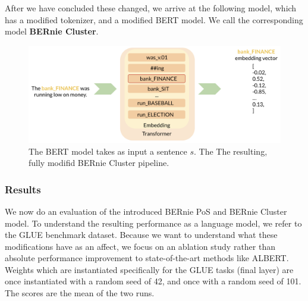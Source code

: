 \documentclass[a4paper,12pt,twoside,openright]{report}
\begin{document}
After we have concluded these changed, we arrive at the following model, which has a modified tokenizer, and a modified BERT model.
We call the corresponding model \textbf{BERnie Cluster}.

\begin{figure}[H]
	\center
  \includegraphics[width=\linewidth]{./assets/experiments/pipeline_model_BERnie_meaning.png}
  \caption{The BERT model takes as input a sentence $s$. The The resulting, fully modifid BERnie Cluster pipeline.}
  \label{fig:cbow_skipgram}
\end{figure}


\subsubsection{Results}

We now do an evaluation of the introduced BERnie PoS and BERnie Cluster model.
To understand the resulting performance as a language model, we refer to the GLUE benchmark dataset.
Because we want to understand what these modifications have as an affect, we focus on an ablation study rather than absolute performance improvement to state-of-the-art methods like ALBERT.
Weights which are instantiated specifically for the GLUE tasks (final layer) are once instantiated with a random seed of 42, and once with a random seed of 101.
The scores are the mean of the two runs.
\end{document}

